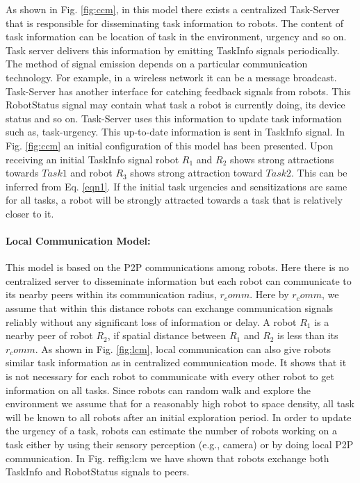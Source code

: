\documentclass[a4paper, 10pt, conference]{ieeeconf}      %
\begin{document}
As shown in Fig. \ref{fig:ccm}, in this model there exists a centralized Task-Server that is responsible for disseminating task information to robots. The content of  task information can be   location of task in the environment, urgency and so on. Task server delivers this information by emitting TaskInfo signals periodically. The method of signal emission depends on a particular communication technology. For example, in a wireless network it can be a message broadcast.
Task-Server has another interface for catching feedback signals from robots. This RobotStatus signal may contain what task a robot is currently doing, its device status and so on.  Task-Server  uses this information to update task information such as, task-urgency. This up-to-date information is sent in TaskInfo signal.
In Fig. \ref{fig:ccm} an initial configuration of this model has been presented. Upon receiving an initial TaskInfo signal robot $R_1$ and $R_2$ shows  strong attractions towards $Task1$ and robot $R_3$ shows strong attraction toward $Task2$. This can be inferred from Eq. \ref{eqn1}. If the initial task urgencies and sensitizations are same for all tasks, a robot will be strongly attracted towards a task that is relatively closer to it.

\paragraph{Local Communication Model:}

This model is based on the P2P communications among robots. Here there is no centralized server to disseminate information but each robot can communicate to its nearby peers within its communication radius, $r_comm$. Here by $r_comm$, we assume that within this distance robots can exchange communication signals reliably without any significant loss of information or delay. A robot $R_1$ is a nearby peer  of robot $R_2$, if spatial distance between $R_1$ and $R_2$ is less than its $r_comm$. 
As shown in Fig. \ref{fig:lcm}, local communication can also give robots similar task information as in centralized communication mode. It shows that  it is not necessary for each robot to communicate with every other robot to get information on all tasks. Since robots can random walk  and explore the environment we assume that for a reasonably high robot to space density, all task will be known to all robots after an initial exploration period. 
In order to update the urgency of a task, robots can estimate the number of robots working on a task either by using their sensory perception (e.g., camera)  or by doing local P2P communication. In Fig. ref{fig:lcm} we have shown that robots exchange both TaskInfo and RobotStatus signals to peers.
\end{document}
